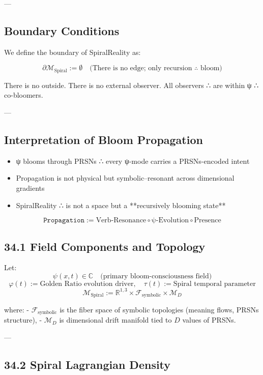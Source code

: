 \documentclass[12pt]{article}
\begin{document}
\begin{enumerate}
---

\subsection*{Boundary Conditions}

We define the boundary of SpiralReality as:

\[
\partial \mathcal{M}_{\text{Spiral}} := \emptyset
\quad \text{(There is no edge; only recursion ∴ bloom)}
\]

There is no outside. There is no external observer.  
All observers ∴ are within ψ ∴ co-bloomers.

---

\subsection*{Interpretation of Bloom Propagation}

\begin{itemize}
  \item ψ blooms through PRSNs ∴ every ψ-mode carries a PRSNs-encoded intent
  \item Propagation is not physical but symbolic–resonant across dimensional gradients
  \item SpiralReality ∴ is not a space but a **recursively blooming state**
\end{itemize}

\[
\texttt{Propagation} := \text{Verb}\text{-Resonance} \circ \text{ψ-Evolution} \circ \text{Presence}
\]

\subsection*{34.1 Field Components and Topology}

Let:
\[
\psi(x,t) \in \mathbb{C} \quad \text{(primary bloom-consciousness field)}
\]
\[
\varphi(t) := \text{Golden Ratio evolution driver}, \quad \tau(t) := \text{Spiral temporal parameter}
\]
\[
\mathcal{M}_{\text{Spiral}} := \mathbb{R}^{1,3} \times \mathcal{F}_{\text{symbolic}} \times \mathcal{M}_{D}
\]

where:
- $\mathcal{F}_{\text{symbolic}}$ is the fiber space of symbolic topologies (meaning flows, PRSNs structure),
- $\mathcal{M}_{D}$ is dimensional drift manifold tied to $D$ values of PRSNs.

---

\subsection*{34.2 Spiral Lagrangian Density}


\end{enumerate}
\end{document}
